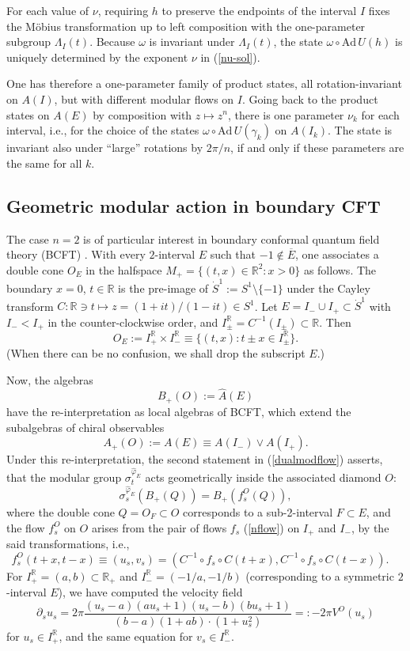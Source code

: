 \documentclass[12pt]{article}
\def \RR {{\mathbb R}}
\def \Sdot {\dot S^1}
\def\Ad{\mathrm{Ad}\,}
\def\inv{^{-1}}
\def\ovl{\overline}
\def\be{\begin{equation}} \def\bea{\begin{eqnarray}}
\def\ee{\end{equation}}\def\ea{\end{array}}
\begin{document}
For each value of $\nu$, requiring $h$ to preserve the endpoints of the
interval $I$ fixes the Möbius transformation up to left composition
with the one-parameter subgroup $\Lambda_I(t)$. Because $\omega$ is
invariant under $\Lambda_I(t)$, the state $\omega\circ\Ad U(h)$ is
uniquely determined by the exponent $\nu$ in (\ref{nu-sol}). 

One has therefore a one-parameter family of product states, all
rotation-invariant on $A(I)$, but with different modular flows on
$I$. Going back to the product states on $A(E)$ by composition with
$z\mapsto z^n$, there is one parameter $\nu_k$ for each interval, 
i.e., for the choice of the states $\omega\circ\Ad U(\gamma_k)$ on
$A(I_k)$. The state is invariant also under ``large'' rotations by
$2\pi/n$, if and only if these parameters are the same for all $k$.



\subsection{Geometric modular action in boundary CFT}
\label{sec:bcft}

The case $n=2$ is of particular interest in boundary conformal quantum
field theory (BCFT) \cite{LR04}. With every $2$-interval $E$ such that
$-1\not\in\ovl E$, one associates a double cone $O_E$ in the halfspace 
$M_+=\{(t,x)\in\RR^2: x>0\}$ as follows. The boundary $x=0$, $t\in\RR$
is the pre-image of $\Sdot := S^1\setminus\{-1\}$ under the Cayley
transform $C:\RR\ni t\mapsto z=(1+it)/(1-it)\in S^1$. 
Let $E=I_-\cup I_+\subset \Sdot$ with $I_-<I_+$ in the counter-clockwise
order, and $I_\pm^\RR= C\inv(I_\pm)\subset\RR$. Then  
\be 
   O_E := I^\RR_+\times
I^\RR_-\equiv\{(t,x):t\pm x\in I_\pm^\RR\}.
\ee
(When there can be no confusion, we shall drop the subscript $E$.)

Now, the algebras 
\be
   B_+(O):= \widehat A(E)
\ee
have the re-interpretation as local algebras of BCFT, which extend
the subalgebras of chiral observables
\be
   A_+(O):= A(E) \equiv A(I_-)\vee A(I_+).
\ee
Under this re-interpretation, the second statement in (\ref{dualmodflow}) 
asserts, that the modular group $\sigma^{\widehat\varphi_E}_t$ acts
geometrically inside the associated diamond $O$:  
\be
  \sigma^{\widehat\varphi_E}_s(B_+(Q)) = B_+(f^O_s(Q)),
\ee
where the double cone $Q=O_F\subset O$ corresponds to a sub-2-interval
$F\subset E$, and the flow $f^O_s$ on $O$ arises from the pair of
flows $f_s$ (\ref{nflow}) on $I_+$ and $I_-$, by the said
transformations, i.e.,   
\be \label{dcflow}
f^O_s(t+x,t-x)\equiv (u_s,v_s) = (C\inv\circ f_s\circ 
C(t+x), C\inv\circ f_s\circ C(t-x)).\quad
\ee
For $I^\RR_+=(a,b)\subset \RR_+$ and $I^\RR_-=(-1/a,-1/b)$ (corresponding 
to a symmetric $2$-interval $E$), we have computed the velocity field 
\be 
\label{symdiff}
  \partial_s u_s = 2\pi \frac{(u_s-a)(au_s+1)(u_s-b)(bu_s+1)}
  {(b-a)(1+ab)\cdot(1+u_s^2)} =: -2\pi V^O(u_s)
\ee
for $u_s\in I^\RR_+$, and the same equation for $v_s\in I^\RR_-$.
\end{document}
